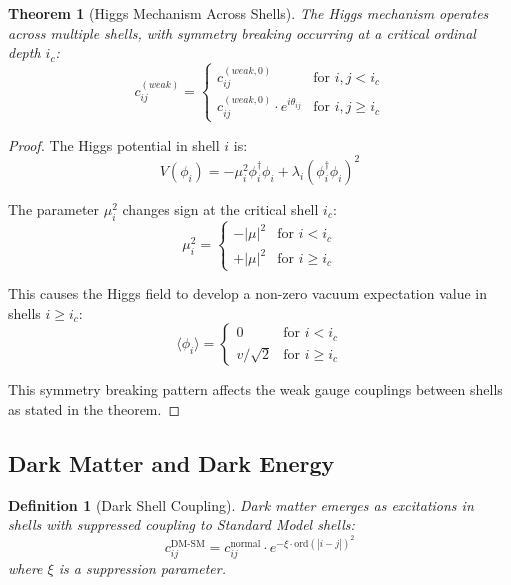 \documentclass[12pt,a4paper]{article}
\newtheorem{theorem}{Theorem}[section]
\newtheorem{definition}{Definition}[section]
\begin{document}
\begin{theorem}[Higgs Mechanism Across Shells]
\label{thm:higgs-mechanism}
The Higgs mechanism operates across multiple shells, with symmetry breaking occurring at a critical ordinal depth $i_c$:
\begin{equation}
c_{ij}^{(weak)} = 
\begin{cases}
c_{ij}^{(weak,0)} & \text{for } i,j < i_c \\
c_{ij}^{(weak,0)} \cdot e^{i\theta_{ij}} & \text{for } i,j \geq i_c
\end{cases}
\end{equation}
\end{theorem}

\begin{proof}
The Higgs potential in shell $i$ is:
\begin{equation}
V(\phi_i) = -\mu_i^2 \phi_i^\dagger \phi_i + \lambda_i (\phi_i^\dagger \phi_i)^2
\end{equation}

The parameter $\mu_i^2$ changes sign at the critical shell $i_c$:
\begin{equation}
\mu_i^2 = 
\begin{cases}
-|\mu|^2 & \text{for } i < i_c \\
+|\mu|^2 & \text{for } i \geq i_c
\end{cases}
\end{equation}

This causes the Higgs field to develop a non-zero vacuum expectation value in shells $i \geq i_c$:
\begin{equation}
\langle \phi_i \rangle = 
\begin{cases}
0 & \text{for } i < i_c \\
v/\sqrt{2} & \text{for } i \geq i_c
\end{cases}
\end{equation}

This symmetry breaking pattern affects the weak gauge couplings between shells as stated in the theorem.
\end{proof}

\subsection{Dark Matter and Dark Energy}
\label{subsec:dark-matter-energy}

\begin{definition}[Dark Shell Coupling]
\label{def:dark-coupling}
Dark matter emerges as excitations in shells with suppressed coupling to Standard Model shells:
\begin{equation}
c_{ij}^{\text{DM-SM}} = c_{ij}^{\text{normal}} \cdot e^{-\xi \cdot \text{ord}(|i-j|)^2}
\end{equation}
where $\xi$ is a suppression parameter.
\end{definition}
\end{document}
